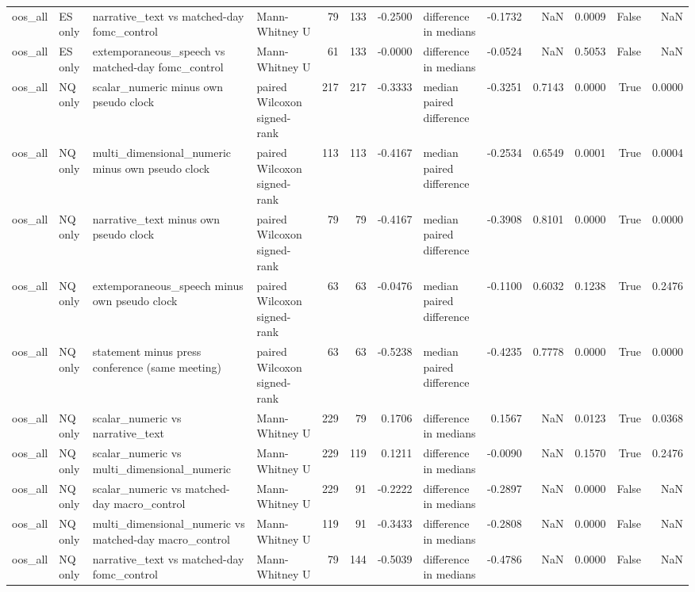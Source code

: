 \begin{tabular}{llllrrrlrrrrr}
oos_all & ES only & narrative_text vs matched-day fomc_control & Mann-Whitney U & 79 & 133 & -0.2500 & difference in medians & -0.1732 & NaN & 0.0009 & False & NaN \\
oos_all & ES only & extemporaneous_speech vs matched-day fomc_control & Mann-Whitney U & 61 & 133 & -0.0000 & difference in medians & -0.0524 & NaN & 0.5053 & False & NaN \\
oos_all & NQ only & scalar_numeric minus own pseudo clock & paired Wilcoxon signed-rank & 217 & 217 & -0.3333 & median paired difference & -0.3251 & 0.7143 & 0.0000 & True & 0.0000 \\
oos_all & NQ only & multi_dimensional_numeric minus own pseudo clock & paired Wilcoxon signed-rank & 113 & 113 & -0.4167 & median paired difference & -0.2534 & 0.6549 & 0.0001 & True & 0.0004 \\
oos_all & NQ only & narrative_text minus own pseudo clock & paired Wilcoxon signed-rank & 79 & 79 & -0.4167 & median paired difference & -0.3908 & 0.8101 & 0.0000 & True & 0.0000 \\
oos_all & NQ only & extemporaneous_speech minus own pseudo clock & paired Wilcoxon signed-rank & 63 & 63 & -0.0476 & median paired difference & -0.1100 & 0.6032 & 0.1238 & True & 0.2476 \\
oos_all & NQ only & statement minus press conference (same meeting) & paired Wilcoxon signed-rank & 63 & 63 & -0.5238 & median paired difference & -0.4235 & 0.7778 & 0.0000 & True & 0.0000 \\
oos_all & NQ only & scalar_numeric vs narrative_text & Mann-Whitney U & 229 & 79 & 0.1706 & difference in medians & 0.1567 & NaN & 0.0123 & True & 0.0368 \\
oos_all & NQ only & scalar_numeric vs multi_dimensional_numeric & Mann-Whitney U & 229 & 119 & 0.1211 & difference in medians & -0.0090 & NaN & 0.1570 & True & 0.2476 \\
oos_all & NQ only & scalar_numeric vs matched-day macro_control & Mann-Whitney U & 229 & 91 & -0.2222 & difference in medians & -0.2897 & NaN & 0.0000 & False & NaN \\
oos_all & NQ only & multi_dimensional_numeric vs matched-day macro_control & Mann-Whitney U & 119 & 91 & -0.3433 & difference in medians & -0.2808 & NaN & 0.0000 & False & NaN \\
oos_all & NQ only & narrative_text vs matched-day fomc_control & Mann-Whitney U & 79 & 144 & -0.5039 & difference in medians & -0.4786 & NaN & 0.0000 & False & NaN \\

\end{tabular}

